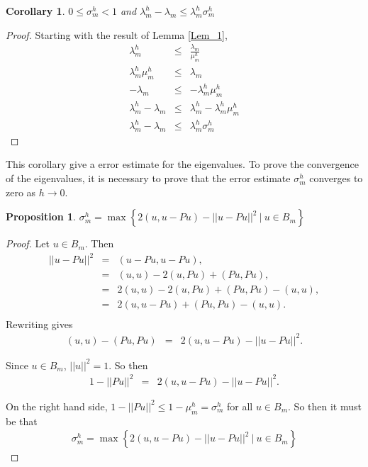 \documentclass[../../main.tex]{subfiles}
\begin{document}
\newtheorem{Cor_1}{Corollary}
\begin{Cor_1}
	$0 \leq \sigma_{m}^{h} < 1$ and $\lambda_{m}^{h} - \lambda_{m} \leq \lambda_{m}^{h}\sigma_{m}^{h}$
\end{Cor_1}
\begin{proof}
	Starting with the result of Lemma \ref{Lem_1},
	\begin{eqnarray*}
		\lambda_{m}^{h} & \leq & \frac{\lambda_{m}}{\mu_{m}^{h}}\\
		\lambda_{m}^{h}\mu_{m}^{h}& \leq & \lambda_{m} \\
		-\lambda_{m}& \leq & -\lambda_{m}^{h}\mu_{m}^{h} \\
		\lambda_{m}^{h} -\lambda_{m}& \leq & \lambda_{m}^{h} -\lambda_{m}^{h}\mu_{m}^{h}\\
		\lambda_{m}^{h} -\lambda_{m}& \leq & \lambda_{m}^{h}\sigma_{m}^{h}
		\end{eqnarray*}
\end{proof}

This corollary give a error estimate for the eigenvalues. To prove the convergence of the eigenvalues, it is necessary to prove that the error estimate $\sigma_{m}^{h}$ converges to zero as $h \rightarrow 0$.\\


\newtheorem{Prop_3}[Prop_1]{Proposition} \label{Prop_3}
\begin{Prop_3}
	$\sigma_{m}^{h} = \max\left\{ 2( u,u-Pu )-||u-Pu||^{2} \ | \ u \in B_{m} \right\}$
\end{Prop_3}
\begin{proof}
	Let $u \in B_{m}$. Then
	\begin{eqnarray*}
		||u - Pu||^{2} &=& ( u - Pu, u - Pu ), \\
						&=& ( u, u ) - 2 ( u, Pu ) + ( Pu, Pu ), \\
						&=& 2( u, u ) - 2 ( u, Pu ) + ( Pu, Pu ) - ( u, u ),\\
						&=& 2( u, u - Pu ) + ( Pu, Pu ) - ( u, u ).\\
	\end{eqnarray*}
	Rewriting gives
	\begin{eqnarray*}
		( u, u ) - ( Pu, Pu )  & = & 2( u, u - Pu ) - ||u - Pu||^{2}.
	\end{eqnarray*}

	Since $u \in B_{m}$, $||u||^{2} = 1$. So then
	\begin{eqnarray*}
		1 - ||Pu||^{2}  & = & 2( u, u - Pu ) - ||u - Pu||^{2}.
	\end{eqnarray*}

	On the right hand side, $1 - ||Pu||^{2} \leq 1 - \mu_{m}^{h} = \sigma_{m}^{h}$ for all $u \in B_{m}$. So then it must be that
	\begin{eqnarray*}
	\sigma_{m}^{h} = \max\left\{ 2( u,u-Pu )-||u-Pu||^{2} \ | \ u \in B_{m} \right \}
	\end{eqnarray*}
\end{proof}
\end{document}
